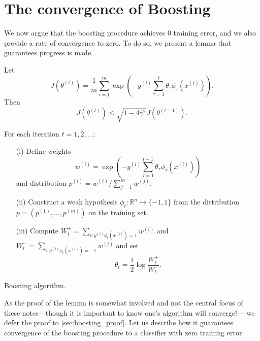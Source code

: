 \section{The convergence of Boosting}
We now argue that the boosting procedure achieves $0$ training error, and we
also provide a rate of convergence to zero. To do so, we present a lemma
that guarantees progress is made.

\begin{lemma}\label{lma:convergence}
Let
\[
J(\theta^{(t)} ) = \frac{1}{m}
\sum_{i=1}^m \exp\left(-y^{(i)}\sum_{\tau=1}^t \theta_\tau \phi_\tau(x^{(i)})\right).
\]
Then
\[
J(\theta^{(t)} ) \le \sqrt{1 - 4\gamma^2} J(\theta^{(t-1)}).
\]
\end{lemma}

\begin{algorithm}
    For each iteration $t = 1,2,\ldots$:
    \begin{itemize}
        \item[(i)] Define weights
            \[
                w^{(i)} = \exp\left( -y^{(i)}\sum_{\tau=1}^{t-1} \theta_\tau \phi_\tau (x^{(i)} )\right)
            \]
            and distribution $p^{(i)} = w^{(i)} / \sum^m_{j=1} w^{(j)}$.
        \item[(ii)] Construct a weak hypothesis $\phi_t : \mathbb R^n \mapsto \{-1,1\}$ from the
        distribution $p = (p^{(1)} ,\ldots,p^{(m)} )$ on the training set.
        \item[(iii)] Compute $W^+_t = \sum_{i:y^{(i)} \phi_t (x^{(i)} )=1} w^{(i)}$ and $W^-_t = \sum_{i:y^{(i)} \phi_t (x^{(i)} )=-1} w^{(i)}$ and set
            \[
                \theta_t = \frac{1}{2} \log \frac{W^+_t}{W^-_t}.
            \]
    \end{itemize}
    \caption{Boosting algorithm.}\label{alg:boosting}
\end{algorithm}
As the proof of the lemma is somewhat involved and not the central focus of
these notes---though it is important to know one's algorithm will converge!---
we defer the proof to \cref{sec:boosting_proof}. Let us describe how it guarantees
convergence of the boosting procedure to a classifier with zero training error.

